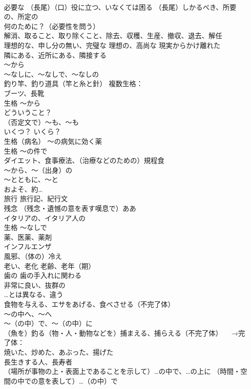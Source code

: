 \documentclass[8pt]{extreport}
\begin{document}
\begin{CJK}{UTF8}{min}
\\	必要な （長尾）（口）役に立つ、いなくては困る （長尾）しかるべき、所要の、所定の
\\	何のために？（必要性を問う）
\\	解消、取ること、取り除くこと、除去、収穫、生産、撤収、退去、解任
\\	理想的な、申し分の無い、完璧な 理想の、高尚な 現実からかけ離れた
\\	隣にある、近所にある、隣接する
\\	～から
\\	～なしに、～なしで、～なしの
\\	釣り竿、釣り道具（竿と糸と針） 複数生格：
\\	ブーツ、長靴
\\	生格	〜から
\\	どういうこと？
\\	（否定文で）〜も、〜も
\\	いくつ？ いくら？
\\	生格（病名）	〜の病気に効く薬
\\	生格	〜の件で
\\	ダイエット、食事療法、（治療などのための）規程食
\\	～から、～（出身）の 
\\	～とともに、～と 
\\	およそ、約…
\\	旅行 旅行記、紀行文
\\	残念 （残念・遺憾の意を表す嘆息で）ああ
\\	イタリアの、イタリア人の
\\	生格	～なしで
\\	薬、医薬、薬剤
\\	インフルエンザ
\\	風邪、（体の）冷え
\\	老い、老化 老齢、老年（期）
\\	歯の 歯の手入れに関わる
\\	非常に良い、抜群の 
\\	…とは異なる、違う
\\	食物を与える、エサをあげる、食べさせる（不完了体）
\\	～の中へ、～へ 
\\	～（の中）で、～（の中）に
\\	（魚を）釣る（物・人・動物などを）捕まえる、捕らえる（不完了体） 　→完了体：
\\	焼いた、炒めた、あぶった、揚げた
\\	長生きする人、長寿者
\\	（場所が事物の上・表面上であることを示して）…の中で、…の上に （時間・空間の中での意を表して）…（の中）で 

\end{CJK}
\end{document}
